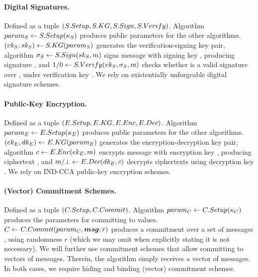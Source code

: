 \paragraph{Digital Signatures.} %
Defined as a tuple $(S.Setup,S.KG,S.Sign,S.Verify)$. Algorithm $param_{S} \gets
S.Setup(\kappa_{S})$ produces public parameters for the other algorithms.
$(vk_{S},sk_{S}) \gets S.KG(param_{S})$ generates the verification-signing key
pair, algorithm $\sigma_{S} \gets S.Sign(sk_{S},m)$ signs message \msg with
signing key \Ssk, producing signature \Ssig, and $1/0 \gets S.Verify(vk_{S},
\sigma_{S},m)$ checks whether \Ssig is a valid signature over \msg, under
verification key \Svk. We rely on existentially unforgeable digital signature
schemes.

\paragraph{Public-Key Encryption.} %
Defined as a tuple $(E.Setup,E.KG,E.Enc,E.Dec)$. Algorithm $param_{E} \gets
E.Setup(\kappa_{E})$ produces public parameters for the other algorithms.
$(ek_{E},dk_{E}) \gets E.KG(param_{E})$ generates the encryption-decryption key
pair, algorithm $c \gets E.Enc(ek_{E},m)$ encrypts message \msg with
encryption key \Eek, producing ciphertext \Ec, and $m/\bot \gets E.Dec(dk_{E},
c)$ decrypts ciphertexts using decryption key \Edk. We rely on IND-CCA
public-key encryption schemes.

\paragraph{(Vector) Commitment Schemes.} %
Defined as a tuple $(C.Setup,C.Commit)$. Algorithm $param_C \gets
C.Setup(\kappa_{C})$ produces the parameters for committing to values. $C
\gets C.Commit(param_C, \boldsymbol{msg}; r)$ produces a commitment \Ccom over a set of
messages \smsg, using randomness $r$ (which we may omit when explicitly
stating it is not necessary). We will further use commitment schemes that
allow committing to vectors of messages. Therein, the \CCommit algorithm simply
receives a vector of messages. In both cases, we require hiding and binding
(vector) commitment schemes.

